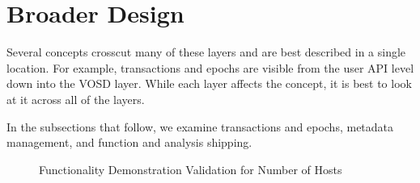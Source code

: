 \documentclass{sig-alt-gov2}
\begin{document}
\section{Broader Design}
\label{sec:broader}

Several concepts crosscut many of these layers and are best described in a
single location. For example, transactions and epochs are visible from the
user API level down into the VOSD layer. While each layer affects the concept,
it is best to look at it across all of the layers.

In the subsections that follow, we examine transactions and epochs, metadata
management, and function and analysis shipping.

\begin{figure}[htbp!]
\centering
\vspace{-0.10in}
\vspace{-0.10in}
\caption{Functionality Demonstration Validation for Number of Hosts}
\label{fig:eval-hosts}
\vspace{-0.05in}
\end{figure}
\end{document}
